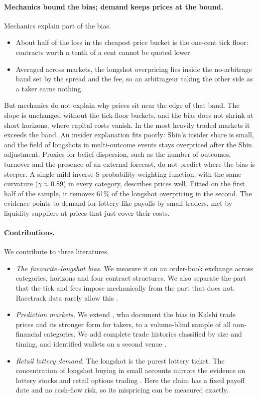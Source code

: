 \paragraph{Mechanics bound the bias; demand keeps prices at the bound.} Mechanics explain part of
the bias.
\begin{itemize}
  \item About half of the loss in the cheapest price bucket is the one-cent tick floor: contracts
  worth a tenth of a cent cannot be quoted lower.
  \item Averaged across markets, the longshot overpricing lies inside the no-arbitrage band set by
  the spread and the fee, so an arbitrageur taking the other side as a taker earns nothing.
\end{itemize}
But mechanics do not explain why prices sit near the edge of that band. The slope is unchanged
without the tick-floor buckets, and the bias does not shrink at short horizons, where capital
costs vanish. In the most heavily traded markets it exceeds the band.
An insider explanation fits poorly: Shin's insider share is small, and the field of longshots in
multi-outcome events stays overpriced after the Shin adjustment.
Proxies for belief dispersion, such as the number of outcomes, turnover and the presence of an
external forecast, do not predict where the bias is steeper. A single mild inverse-S
probability-weighting function, with the same curvature ($\gamma\approx0.89$) in every category,
describes prices well. Fitted on the first half of the sample, it removes 61\% of the longshot
overpricing in the second.
The evidence points to demand for lottery-like payoffs by small traders, met by liquidity
suppliers at prices that just cover their costs.

\paragraph{Contributions.} We contribute to three literatures.
\begin{itemize}
  \item \emph{The favourite--longshot bias.} We measure it on an order-book exchange across
  categories, horizons and four contract structures. We also separate the part that the tick and
  fees impose mechanically from the part that does not. Racetrack data rarely allow this
  \citep{snowbergwolfers2010,gandhi2015}.
  \item \emph{Prediction markets.} We extend \citet{burgi2025}, who document the bias in Kalshi
  trade prices and its stronger form for takers, to a volume-blind sample of all non-financial
  categories. We add complete trade histories classified by size and timing, and identified
  wallets on a second venue \citep{rothschildsethi2016,akey2026}.
  \item \emph{Retail lottery demand.} The longshot is the purest lottery ticket. The concentration
  of longshot buying in small accounts mirrors the evidence on lottery stocks and retail options
  trading \citep{kumar2009,bali2011,bryzgalova2023}. Here the claim has a fixed payoff date and no
  cash-flow risk, so its mispricing can be measured exactly.
\end{itemize}

